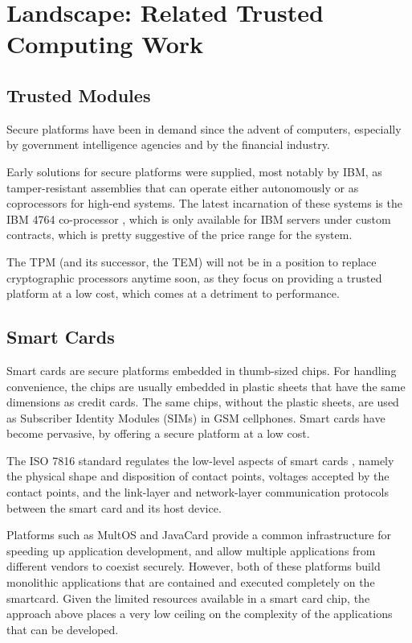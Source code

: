 \section{Landscape: Related Trusted Computing Work}\label{intro:landscape}

\subsection{Trusted Modules}\label{intro:trusted_modules}
Secure platforms have been in demand since the advent of computers,
especially by government intelligence agencies and by the financial industry.

Early solutions for secure platforms were supplied, most notably by IBM, as
tamper-resistant assemblies that can operate either autonomously or as
coprocessors for high-end systems. The latest incarnation of these systems is
the IBM 4764 co-processor \cite{arnold2004ipn}, which is only available for IBM
servers under custom contracts, which is pretty suggestive of the price range for the system.

The TPM (and its successor, the TEM) will not be in a position to
replace cryptographic processors anytime soon, as they focus on providing a
trusted platform at a low cost, which comes at a detriment to performance.

\subsection{Smart Cards}
Smart cards \cite{hendry2001scs} are secure platforms embedded in thumb-sized
chips. For handling convenience, the chips are usually embedded in plastic
sheets that have the same dimensions as credit cards. The same chips, without
the plastic sheets, are used as Subscriber Identity Modules (SIMs) in GSM
cellphones. Smart cards have become pervasive, by offering a secure platform at
a low cost.

The ISO 7816 standard regulates the low-level aspects of
smart cards \cite{husemann2001ssc}, namely the physical shape and disposition of
contact points, voltages accepted by the contact points, and the link-layer and network-layer
communication protocols between the smart card and its host device.

Platforms such as MultOS \cite{maosco:m} and JavaCard
\cite{microsystems2003jcp} provide a common infrastructure for speeding up
application development, and allow multiple applications from different vendors
to coexist securely. However, both of these platforms build monolithic
applications that are contained and executed completely on the
smartcard. Given the limited resources available in a smart card chip, the
approach above places a very low ceiling on the complexity of the applications
that can be developed.

